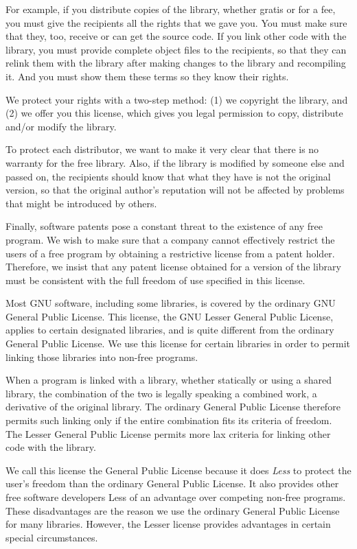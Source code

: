   For example, if you distribute copies of the library, whether gratis
or for a fee, you must give the recipients all the rights that we gave
you.  You must make sure that they, too, receive or can get the source
code.  If you link other code with the library, you must provide
complete object files to the recipients, so that they can relink them
with the library after making changes to the library and recompiling
it.  And you must show them these terms so they know their rights.

  We protect your rights with a two-step method: (1) we copyright the
library, and (2) we offer you this license, which gives you legal
permission to copy, distribute and/or modify the library.

  To protect each distributor, we want to make it very clear that
there is no warranty for the free library.  Also, if the library is
modified by someone else and passed on, the recipients should know
that what they have is not the original version, so that the original
author's reputation will not be affected by problems that might be
introduced by others.

  Finally, software patents pose a constant threat to the existence of
any free program.  We wish to make sure that a company cannot
effectively restrict the users of a free program by obtaining a
restrictive license from a patent holder.  Therefore, we insist that
any patent license obtained for a version of the library must be
consistent with the full freedom of use specified in this license.

  Most GNU software, including some libraries, is covered by the
ordinary GNU General Public License.  This license, the GNU Lesser
General Public License, applies to certain designated libraries, and
is quite different from the ordinary General Public License.  We use
this license for certain libraries in order to permit linking those
libraries into non-free programs.

  When a program is linked with a library, whether statically or using
a shared library, the combination of the two is legally speaking a
combined work, a derivative of the original library.  The ordinary
General Public License therefore permits such linking only if the
entire combination fits its criteria of freedom.  The Lesser General
Public License permits more lax criteria for linking other code with
the library.

  We call this license the  General Public License because it
does \emph{Less} to protect the user's freedom than the ordinary General
Public License.  It also provides other free software developers Less
of an advantage over competing non-free programs.  These disadvantages
are the reason we use the ordinary General Public License for many
libraries.  However, the Lesser license provides advantages in certain
special circumstances.

